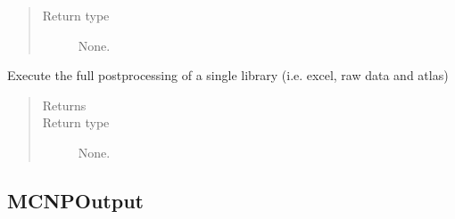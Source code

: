 \documentclass[letterpaper,10pt,english]{sphinxmanual}
\begin{document}
\begin{fulllineitems}
\begin{fulllineitems}
\begin{quote}
\begin{description}
\item[{Return type}] \leavevmode
\sphinxAtStartPar
None.

\end{description}\end{quote}

\end{fulllineitems}


\begin{fulllineitems}
\label{\detokenize{api/postprocessing:output.BenchmarkOutput.single_postprocess}}
\sphinxAtStartPar
Execute the full post\sphinxhyphen{}processing of a single library (i.e. excel,
raw data and atlas)
\begin{quote}\begin{description}
\item[{Returns}] \leavevmode
\sphinxAtStartPar


\item[{Return type}] \leavevmode
\sphinxAtStartPar
None.

\end{description}\end{quote}

\end{fulllineitems}


\end{fulllineitems}



\subsection{MCNPOutput}
\label{\detokenize{api/postprocessing:mcnpoutput}}\label{\detokenize{api/postprocessing:mcnpoutputob}}
\end{document}
